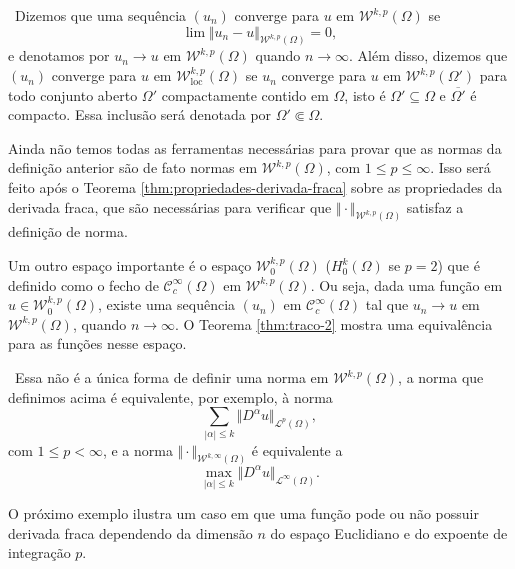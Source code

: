 \documentclass[a4paper, 11pt]{book}
\theoremstyle{definition}
\newcommand{\obs}{\noindent{\textbf{\textcolor{black}{\sffamily Observação:}}}~}
\newcommand{\cC}{\mathcal{C}}
\newcommand{\cL}{\mathcal{L}}
\newcommand{\cW}{\mathcal{W}}
\newcommand{\loc}{\mathrm{loc}}
\begin{document}
\obs Dizemos que uma sequência $(u_n)$ converge para $u$ em $\cW^{k,p}(\Omega)$ se
\[
    \lim \Vert u_n - u \Vert_{\cW^{k,p}(\Omega)} = 0,
\]
e denotamos por $u_n \to u \text{ em } \cW^{k,p}(\Omega)$ quando $n \to \infty$.
Além disso, dizemos que $(u_n)$ converge para $u$ em $\cW^{k,p}_\loc(\Omega)$ se $u_n$ converge para $u$ em $\cW^{k,p}(\Omega')$ para todo conjunto aberto $\Omega'$ compactamente contido em $\Omega$, isto é $\Omega' \subseteq \Omega$ e $\overline{\Omega'}$ é compacto. Essa inclusão será denotada por $\Omega' \Subset \Omega$.

Ainda não temos todas as ferramentas necessárias para provar que as normas da definição anterior são de fato normas em $\cW^{k,p}(\Omega)$, com $1 \leqslant p \leqslant \infty$. Isso será feito após o Teorema \ref{thm:propriedades-derivada-fraca} sobre as propriedades da derivada fraca, que são necessárias para verificar que $\Vert \cdot \Vert_{\cW^{k,p}(\Omega)}$ satisfaz a definição de norma.

Um outro espaço importante é o espaço $\cW^{k,p}_0(\Omega)$ ($H^k_0(\Omega)$ se $p = 2$) que é definido como o fecho de $\cC^{\infty}_c(\Omega)$ em $\cW^{k,p}(\Omega)$. Ou seja, dada uma função em $u \in \cW^{k,p}_0(\Omega)$, existe uma sequência $(u_n)$ em $\cC^{\infty}_c(\Omega)$ tal que $u_n \to u$ em $\cW^{k,p}(\Omega)$, quando $n \to \infty$.
O Teorema \ref{thm:traco-2} mostra uma equivalência para as funções nesse espaço.

\obs Essa não é a única forma de definir uma norma em $\cW^{k,p}(\Omega)$, a norma que definimos acima é equivalente, por exemplo, à norma
\[
    \sum_{|\alpha| \leqslant k} \Vert D^\alpha u \Vert_{\cL^p(\Omega)},
\]
com $1 \leqslant p < \infty$, e a norma $\Vert \cdot \Vert_{\cW^{k,\infty}(\Omega)}$ é equivalente a
\[
    \max_{|\alpha|\leqslant k} \Vert D^\alpha u \Vert_{\cL^\infty(\Omega)}.
\]

O próximo exemplo ilustra um caso em que uma função pode ou não possuir derivada fraca dependendo da dimensão $n$ do espaço Euclidiano e do expoente de integração $p$.
\end{document}
